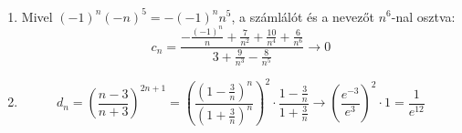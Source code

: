 \documentclass[11pt]{scrartcl}
\begin{document}
\begin{enumerate}
	\item Mivel $(-1)^n (-n)^5 = -(-1)^n n^5$, a számlálót és a nevezőt $n^6$-nal
	      osztva:
	      \[
		      c_n
		      = \frac{
			      -\frac{(-1)^n}{n} + \frac{7}{n^2} + \frac{10}{n^4} + \frac{6}{n^6}
		      }{
			      3 + \frac{9}{n^3} - \frac{8}{n^5}
		      }
		      \to 0
	      \]

	\item \[
		      d_n
		      = \left( \frac{n - 3}{n + 3} \right)^{2n + 1}
		      = \left(
		      \frac{\left(1 - \frac{3}{n}\right)^n}{\left(1 + \frac{3}{n}\right)^n}
		      \right)^2
		      \cdot \frac{1 - \frac{3}{n}}{1 + \frac{3}{n}}
		      \to \left( \frac{e^{-3}}{e^3} \right)^2 \cdot 1
		      = \frac{1}{e^{12}}
	      \]
\end{enumerate}
\end{document}
